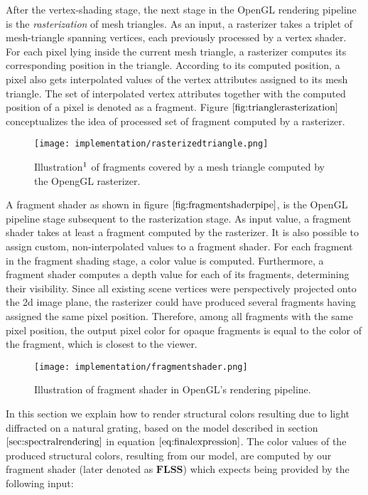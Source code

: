 After the vertex-shading stage, the next stage in the OpenGL rendering pipeline is the \emph{rasterization} of mesh triangles. As an input, a rasterizer takes a triplet of mesh-triangle spanning vertices, each previously processed by a vertex shader. For each pixel lying inside the current mesh triangle, a rasterizer computes its corresponding position in the triangle. According to its computed position, a pixel also gets interpolated values of the vertex attributes assigned to its mesh triangle. The set of interpolated vertex attributes together with the computed position of a pixel is denoted as a fragment. Figure $\ref{fig:trianglerasterization}$ conceptualizes the idea of processed set of fragment computed by a rasterizer.

\begin{figure}[H]
  \centering
  \texttt{[image: implementation/rasterizedtriangle.png]}
  \caption[Triangle Rasterization]{Illustration$\footnotemark$ of fragments covered by a mesh triangle computed by the OpengGL rasterizer.}
  \label{fig:trianglerasterization}
\end{figure}

A fragment shader as shown in figure $\ref{fig:fragmentshaderpipe}$, is the OpenGL pipeline stage subsequent to the rasterization stage. As input value, a fragment shader takes at least a fragment computed by the rasterizer. It is also possible to assign custom, non-interpolated values to a fragment shader. For each fragment in the fragment shading stage, a color value is computed. Furthermore, a fragment shader computes a depth value for each of its fragments, determining their visibility. Since all existing scene vertices were perspectively projected onto the 2d image plane, the rasterizer could have produced several fragments having assigned the same pixel position. Therefore, among all fragments with the same pixel position, the output pixel color for opaque fragments is equal to the color of the fragment, which is closest to the viewer.

\begin{figure}[H]
  \centering
  \texttt{[image: implementation/fragmentshader.png]}
  \caption[Fragment Shader]{Illustration of fragment shader in OpenGL's rendering pipeline.}
  \label{fig:fragmentshaderpipe}
\end{figure}

\label{sec:flssshader}
\label{sec:inputlists}
In this section we explain how to render structural colors resulting due to light diffracted on a natural grating, based on the model described in section $\ref{sec:spectralrendering}$ in equation $\ref{eq:finalexpression}$. The color values of the produced structural colors, resulting from our model, are computed by our fragment shader (later denoted as $\textbf{FLSS}$) which expects being provided by the following input:

